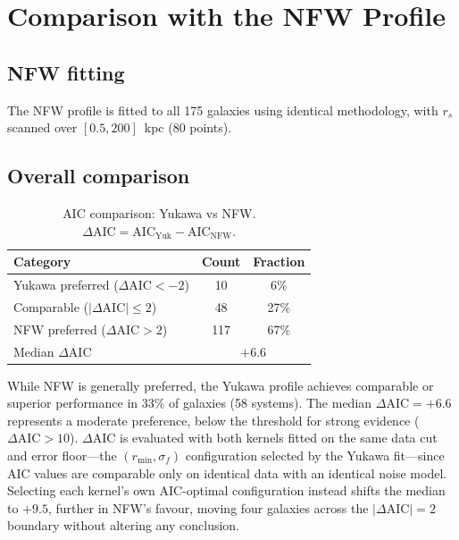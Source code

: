 \documentclass[11pt,a4paper]{article}
\begin{document}
\section{Comparison with the NFW Profile}
\label{sec:nfw}

\subsection{NFW fitting}

The NFW profile is fitted to all 175 galaxies using identical
methodology, with $r_s$ scanned over $[0.5, 200]$~kpc (80 points).

\subsection{Overall comparison}

\begin{table}[h]
\centering
\begin{tabular}{lcc}
\toprule
Category & Count & Fraction \\
\midrule
Yukawa preferred ($\Delta\mathrm{AIC} < -2$) & 10 & 6\% \\
Comparable ($|\Delta\mathrm{AIC}| \leq 2$) & 48 & 27\% \\
NFW preferred ($\Delta\mathrm{AIC} > 2$) & 117 & 67\% \\
\midrule
Median $\Delta\mathrm{AIC}$ & \multicolumn{2}{c}{$+6.6$} \\
\bottomrule
\end{tabular}
\caption{AIC comparison: Yukawa vs NFW.
$\Delta\mathrm{AIC} = \mathrm{AIC}_{\mathrm{Yuk}} - \mathrm{AIC}_{\mathrm{NFW}}$.}
\label{tab:nfw}
\end{table}

While NFW is generally preferred, the Yukawa profile achieves
comparable or superior performance in 33\% of galaxies (58 systems).
The median $\Delta\mathrm{AIC} = +6.6$ represents a moderate
preference, below the threshold for strong evidence ($\Delta\mathrm{AIC} > 10$).
$\Delta\mathrm{AIC}$ is evaluated with both kernels fitted on the
same data cut and error floor---the $(r_{\min}, \sigma_f)$
configuration selected by the Yukawa fit---since AIC values are
comparable only on identical data with an identical noise model.
Selecting each kernel's own AIC-optimal configuration instead
shifts the median to $+9.5$, further in NFW's favour, moving four
galaxies across the $|\Delta\mathrm{AIC}| = 2$ boundary without
altering any conclusion.
\end{document}
